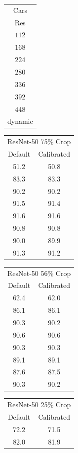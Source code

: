 \begin{table}[t]
    \begin{tabular}{c|}
    Cars\\
    Res \\
    \hline
    $112$ \\ 
    $168$ \\ 
    $224$ \\ 
    $280$ \\ 
    $336$ \\ 
    $392$ \\ 
    $448$ \\
    dynamic\\
    \end{tabular}
    \begin{tabular}{|c|c|}
    \multicolumn{2}{|c|}{ ResNet-50 75\% Crop}\\
    Default & Calibrated \\
    \hline
    51.2 & {\color{red} 50.8} \\
    83.3 & 83.3\\ 
    90.2 & 90.2\\ 
    91.5 & 91.4\\ 
    91.6 & 91.6\\ 
    90.8 & 90.8\\ 
    90.0 & 89.9\\
    91.3 & 91.2\\ 
    \end{tabular}
    \begin{tabular}{|c|c|}
    \multicolumn{2}{|c|}{ ResNet-50 56\% Crop}\\
    Default & Calibrated  \\
    \hline
    62.4 & {\color{red}62.0} \\ 
    86.1 & 86.1 \\ 
    90.3 & 90.2 \\ 
    90.6 & 90.6 \\ 
    90.3 & 90.3 \\ 
    89.1 & 89.1 \\ 
    87.6 & 87.5 \\
    90.3 & 90.2 \\ 
    \end{tabular}
    \begin{tabular}{|c|c|}
    \multicolumn{2}{|c|}{ ResNet-50 25\% Crop}\\
    Default & Calibrated  \\
    \hline
    72.2 & {\color{red} 71.5} \\ 
    82.0 & 81.9 \\ 

\end{tabular}
\end{table}
